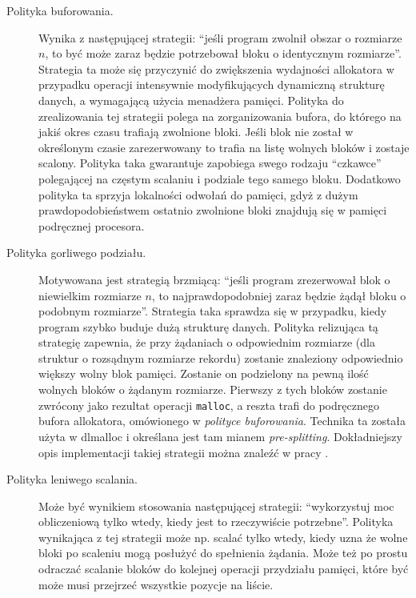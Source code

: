 \documentclass[12pt,a4paper,titlepage,twoside]{mwart}
\begin{document}
\begin{description}
\item[Polityka buforowania.] Wynika z następującej strategii: ``jeśli program
zwolnił obszar o rozmiarze $n$, to być może zaraz będzie potrzebował bloku o
identycznym rozmiarze''. Strategia ta może się przyczynić do zwiększenia
wydajności allokatora w przypadku operacji intensywnie modyfikujących
dynamiczną strukturę danych, a wymagającą użycia menadżera pamięci. Polityka do
zrealizowania tej strategii polega na zorganizowania bufora, do którego na
jakiś okres czasu trafiają zwolnione bloki. Jeśli blok nie został w określonym
czasie zarezerwowany to trafia na listę wolnych bloków i zostaje scalony.
Polityka taka gwarantuje zapobiega swego rodzaju ``czkawce'' polegającej na
częstym scalaniu i podziale tego samego bloku. Dodatkowo polityka ta sprzyja
lokalności odwołań do pamięci, gdyż z dużym prawdopodobieństwem ostatnio
zwolnione bloki znajdują się w pamięci podręcznej procesora.
\vspace{1ex}

\item[Polityka gorliwego podziału.] Motywowana jest strategią brzmiącą: ``jeśli
program zrezerwował blok o niewielkim rozmiarze $n$, to najprawdopodobniej
zaraz będzie żądął bloku o podobnym rozmiarze''. Strategia taka sprawdza się w
przypadku, kiedy program szybko buduje dużą strukturę danych. Polityka
relizująca tą strategię zapewnia, że przy żądaniach o odpowiednim rozmiarze
(dla struktur o rozsądnym rozmiarze rekordu) zostanie znaleziony odpowiednio
większy wolny blok pamięci. Zostanie on podzielony na pewną ilość wolnych
bloków o żądanym rozmiarze. Pierwszy z tych bloków zostanie zwrócony jako
rezultat operacji \texttt{malloc}, a reszta trafi do podręcznego bufora
allokatora, omówionego w \textit{polityce buforowania}. Technika ta została
użyta w dlmalloc \cite{douglea96malloc} i określana jest tam mianem
\textit{pre-splitting}. Dokładniejszy opis implementacji takiej strategii można
znaleźć w pracy \cite{weinstock88quickfit}.
\vspace{1ex}

\item[Polityka leniwego scalania.] Może być wynikiem stosowania następującej
strategii: ``wykorzystuj moc obliczeniową tylko wtedy, kiedy jest to
rzeczywiście potrzebne''. Polityka wynikająca z tej strategii może np. scalać
tylko wtedy, kiedy uzna że wolne bloki po scaleniu mogą posłużyć do spełnienia
żądania. Może też po prostu odraczać scalanie bloków do kolejnej operacji
przydziału pamięci, które być może musi przejrzeć wszystkie pozycje na liście.
\end{description}
\end{document}
